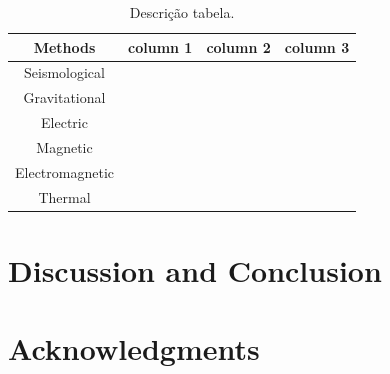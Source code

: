 \documentclass[twoside,letterpaper,twocolumn]{article}
\begin{document}
\begin{table}[htb]
	\caption{Descrição tabela.}
	\label{tab:label1}
	\begin{tabular}{|c|c|c|c|}
		\hline 
		\textbf{Methods} & \textbf{column 1} & \textbf{column 2} & \textbf{column 3} \\ 
		\hline 
		Seismological    &  &  &  \\ 
		\hline 
		Gravitational    &  &  &  \\ 
		\hline 
		Electric         &  &  &  \\ 
		\hline 
		Magnetic         &  &  &  \\ 
		\hline 
		Electromagnetic  &  &  &  \\ 
		\hline 
		Thermal          &  &  &  \\ 
		\hline 
	\end{tabular} 
\end{table}


\section*{Discussion and Conclusion}

\lipsum[1-3]





%
%
%
%
%

\section{Acknowledgments}

\lipsum[11]
\end{document}
